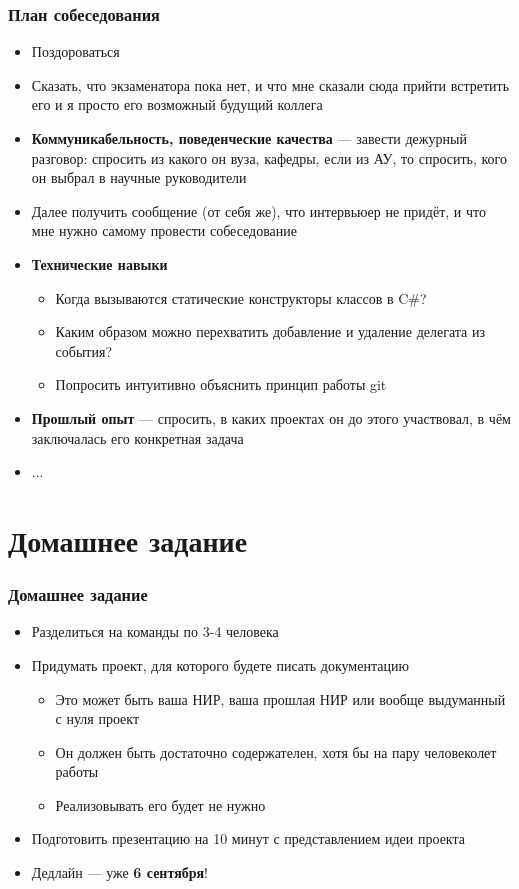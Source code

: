 \documentclass[xetex,mathserif,serif]{beamer}
\begin{document}
	\begin{frame}
		\frametitle{План собеседования}
		\begin{small}
			\begin{itemize}
				\item Поздороваться
				\item Сказать, что экзаменатора пока нет, и что мне сказали сюда прийти встретить его и я просто его возможный будущий коллега
				\item \textbf{Коммуникабельность, поведенческие качества} --- завести дежурный разговор: спросить из какого он вуза, кафедры, если из АУ, то спросить, кого он выбрал в научные руководители
				\item Далее получить сообщение (от себя же), что интервьюер не придёт, и что мне нужно самому провести собеседование
				\item \textbf{Технические навыки}
				\begin{itemize}
					\item ​Когда вызываются статические конструкторы классов в C\#?
					\item Каким образом можно перехватить добавление и удаление делегата из события?
					\item Попросить интуитивно объяснить принцип работы git
				\end{itemize}
				\item \textbf{Прошлый опыт} --- спросить, в каких проектах он до этого участвовал, в чём заключалась его конкретная задача
				\item ...
			\end{itemize}
		\end{small}
	\end{frame}

	\section{Домашнее задание}

	\begin{frame}
		\frametitle{Домашнее задание}
		\begin{itemize}
			\item Разделиться на команды по 3-4 человека
			\item Придумать проект, для которого будете писать документацию
			\begin{itemize}
				\item Это может быть ваша НИР, ваша прошлая НИР или вообще выдуманный с нуля проект
				\item Он должен быть достаточно содержателен, хотя бы на пару человеколет работы
				\item Реализовывать его будет не нужно
			\end{itemize}
			\item Подготовить презентацию на 10 минут с представлением идеи проекта
			\item Дедлайн --- уже \textbf{6 сентября}!
		\end{itemize}
	\end{frame}
\end{document}
